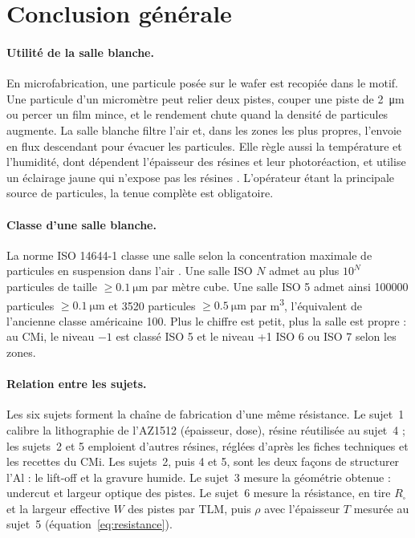 \section*{Conclusion générale}
{}

\paragraph{Utilité de la salle blanche.}
En microfabrication, une particule posée sur le wafer est recopiée dans le motif. Une particule d'un micromètre peut relier deux pistes, couper une piste de \qty{2}{\micro\metre} ou percer un film mince, et le rendement chute quand la densité de particules augmente. La salle blanche filtre l'air et, dans les zones les plus propres, l'envoie en flux descendant pour évacuer les particules. Elle règle aussi la température et l'humidité, dont dépendent l'épaisseur des résines et leur photoréaction, et utilise un éclairage jaune qui n'expose pas les résines \cite{intro,cours303}. L'opérateur étant la principale source de particules, la tenue complète est obligatoire.

\paragraph{Classe d'une salle blanche.}
La norme ISO 14644-1 classe une salle selon la concentration maximale de particules en suspension dans l'air \cite{cours303}. Une salle ISO $N$ admet au plus $10^N$ particules de taille $\geq \qty{0,1}{\micro\metre}$ par mètre cube. Une salle ISO 5 admet ainsi \num{100000} particules $\geq \qty{0,1}{\micro\metre}$ et \num{3520} particules $\geq \qty{0,5}{\micro\metre}$ par \unit{\metre\cubed}, l'équivalent de l'ancienne classe américaine 100. Plus le chiffre est petit, plus la salle est propre : au CMi, le niveau $-1$ est classé ISO 5 et le niveau +1 ISO 6 ou ISO 7 selon les zones.

\paragraph{Relation entre les sujets.}
Les six sujets forment la chaîne de fabrication d'une même résistance. Le sujet~1 calibre la lithographie de l'AZ1512 (épaisseur, dose), résine réutilisée au sujet~4 ; les sujets~2 et 5 emploient d'autres résines, réglées d'après les fiches techniques et les recettes du CMi. Les sujets~2, puis 4 et 5, sont les deux façons de structurer l'Al : le lift-off et la gravure humide. Le sujet~3 mesure la géométrie obtenue : undercut et largeur optique des pistes. Le sujet~6 mesure la résistance, en tire $R_\square$ et la largeur effective $W$ des pistes par TLM, puis $\rho$ avec l'épaisseur $T$ mesurée au sujet~5 (équation~\ref{eq:resistance}).

